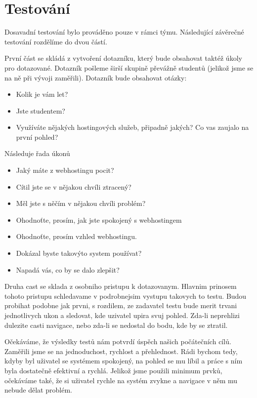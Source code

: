 \documentclass[11pt,a4paper]{article}
\begin{document}
  \section{Testování}
  Dosavadní testování bylo prováděno pouze v rámci týmu. Následující závěrečné
  testování rozdělíme do dvou částí. 

  První část se skládá z vytvoření dotazníku, 
  který bude obsahovat taktéž úkoly pro dotazované. Dotazník pošleme širší skupině
  převážně studentů (jelikož jsme se na ně při vývoji zaměřili). Dotazník bude obsahovat otázky:
  
  \begin{itemize}
    \item Kolik je vám let?
    \item Jste studentem?
    \item Využíváte nějakých hostingových služeb, připadně jakých? Co vas zaujalo na první pohled?
  \end{itemize}

  Následuje řada úkonů

  \begin{itemize}
    \item Jaký máte z webhostingu pocit?
    \item Cítil jste se v nějakou chvíli ztracený?
    \item Měl jste s něčím v nějakou chvíli problém?
    \item Ohodnoťte, prosím, jak jste spokojený s webhostingem
    \item Ohodnoťte, prosím vzhled webhostingu.
    \item Dokázal byste takovýto system používat?
    \item Napadá vás, co by se dalo zlepšit?
  \end{itemize}

  Druha cast se sklada z osobniho pristupu k dotazovanym. Hlavnim prinosem tohoto pristupu 
  schledavame v podrobnejsim vystupu takovych to testu. Budou probihat podobne jak prvni, 
  s rozdilem, ze zadavatel testu bude merit trvani jednotlivych ukon a sledovat, kde uzivatel
  upira svuj pohled. Zda-li neprehlizi dulezite casti navigace, nebo zda-li se nedostal 
  do bodu, kde by se ztratil.

  Očekáváme, že výsledky testů nám potvrdí úspěch našich počátečních cílů. Zaměřili jsme se
  na jednoduchost, rychlost a přehlednost. Rádi bychom tedy, kdyby byl uživatel se 
  systémem spokojený, na pohled se mu líbil a práce s ním byla dostatečně efektivní a rychlá.
  Jelikož jsme použili minimum prvků, očekáváme také, že si uživatel rychle na systém
  zvykne a navigace v něm mu nebude dělat problém.
\end{document}
